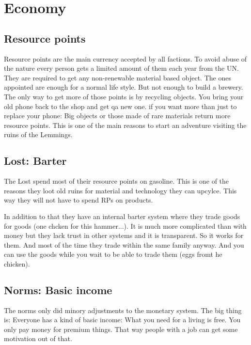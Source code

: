 \chapter{Economy}

\section{Resource points}
\label{sec:Resource points}
Resource points are the main currency accepted by all factions. To avoid abuse of the nature every person gets a limited amount of them each year from the UN. They are required to get any non-renewable material based object. The ones appointed are enough for a normal life style. But not enough to build a brewery. The only way to get more of those points is by recycling objects. You bring your old phone back to the shop and get qa new one. if you want more than just to replace your phone: Big objects or those made of rare materials return more resource points. This is one of the main reasons to start an adventure visiting the ruins of the Lemmings. 


\section{Lost: Barter}
\label{sec:Barter}
The Lost spend most of their resource points on gasoline. This is one of the reasons they loot old ruins for material and technology they can upcylce. This way they will not have to spend RPs on products.

In addition to that they have an internal barter system where they trade goods for goods (one chcken for this hammer...).
It is much more complicated than with money but they lack trust in other systems and it is transparent. So it works for them. And most of the time they trade within the same family anyway.
And you can use the goods while you wait to be able to trade them (eggs fromt he chicken).


\section{Norms: Basic income}
\label{sec:basic income}

The norms only did minory adjustments to the monetary system. The big thing is: Everyone has a kind of basic income: What you need for a living is free.
You only pay money for premium things. That way people with a job can get some motivation out of that.

